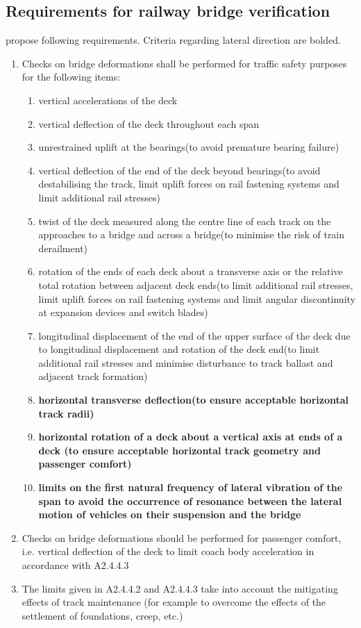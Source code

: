 \begin{appendices}
\section{Requirements for railway bridge verification}
\citet{EC0} propose following requirements. Criteria regarding lateral direction are bolded.


\begin{enumerate}
	\item Checks on bridge deformations shall be performed for traffic safety purposes for the following items:
	\begin{enumerate}[-]
		\item vertical accelerations of the deck
		\item vertical deflection of the deck throughout each span
		\item unrestrained uplift at the bearings(to avoid premature bearing failure)
		\item vertical deflection of the end of the deck beyond bearings(to avoid destabilising the track, limit uplift forces on rail fastening systems and limit additional rail stresses) 
		\item twist of the deck measured along the centre line of each track on the approaches to a bridge and across a bridge(to minimise the risk of train derailment)
		\item rotation of the ends of each deck about a transverse axis or the relative total rotation between adjacent deck ends(to limit additional rail stresses, limit uplift forces on rail fastening systems and limit angular discontinuity at expansion devices and switch blades)
		\item longitudinal displacement of the end of the upper surface of the deck due to longitudinal displacement and rotation of the deck end(to limit additional rail stresses and minimise disturbance to track ballast and adjacent track formation)
		\item \textbf{horizontal transverse deflection(to ensure acceptable horizontal track radii)}
		\item \textbf{horizontal rotation of a deck about a vertical axis at ends of a deck (to ensure acceptable horizontal track geometry and passenger comfort)}
		\item \textbf{limits on the first natural frequency of lateral vibration of the span to avoid the occurrence of resonance between the lateral motion of vehicles on their suspension and the bridge}
	\end{enumerate}
	\item Checks on bridge deformations should be performed for passenger comfort, i.e. vertical deflection of the deck to limit coach body acceleration in accordance with A2.4.4.3\citet{EC0}
	\item The limits given in A2.4.4.2 and A2.4.4.3\citet{EC0} take into account the mitigating effects of track maintenance (for example to overcome the effects of the settlement of foundations, creep, etc.) 
\end{enumerate}



\end{appendices}
